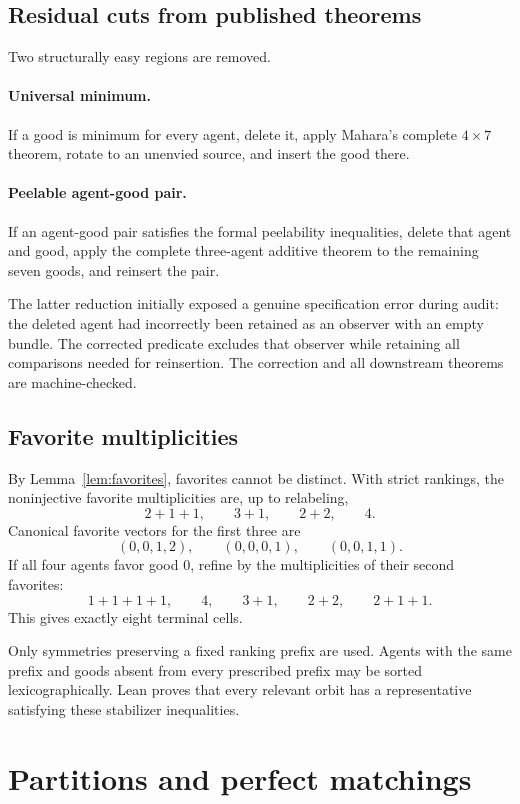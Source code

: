 \documentclass[11pt]{article}
\theoremstyle{definition}
\begin{document}
\subsection{Residual cuts from published theorems}

Two structurally easy regions are removed.

\paragraph{Universal minimum.}
If a good is minimum for every agent, delete it, apply Mahara's complete
$4\times7$ theorem, rotate to an unenvied source, and insert the good there.

\paragraph{Peelable agent-good pair.}
If an agent-good pair satisfies the formal peelability inequalities, delete
that agent and good, apply the complete three-agent additive theorem to the
remaining seven goods, and reinsert the pair.

The latter reduction initially exposed a genuine specification error during
audit: the deleted agent had incorrectly been retained as an observer with an
empty bundle. The corrected predicate excludes that observer while retaining
all comparisons needed for reinsertion. The correction and all downstream
theorems are machine-checked.

\subsection{Favorite multiplicities}

By Lemma~\ref{lem:favorites}, favorites cannot be distinct. With strict
rankings, the noninjective favorite multiplicities are, up to relabeling,
\[
  2+1+1,\qquad3+1,\qquad2+2,\qquad4.
\]
Canonical favorite vectors for the first three are
\[
  (0,0,1,2),\qquad(0,0,0,1),\qquad(0,0,1,1).
\]
If all four agents favor good $0$, refine by the multiplicities of their
second favorites:
\[
  1+1+1+1,\qquad4,\qquad3+1,\qquad2+2,\qquad2+1+1.
\]
This gives exactly eight terminal cells.

Only symmetries preserving a fixed ranking prefix are used. Agents with the
same prefix and goods absent from every prescribed prefix may be sorted
lexicographically. Lean proves that every relevant orbit has a representative
satisfying these stabilizer inequalities.

\section{Partitions and perfect matchings}
\end{document}
